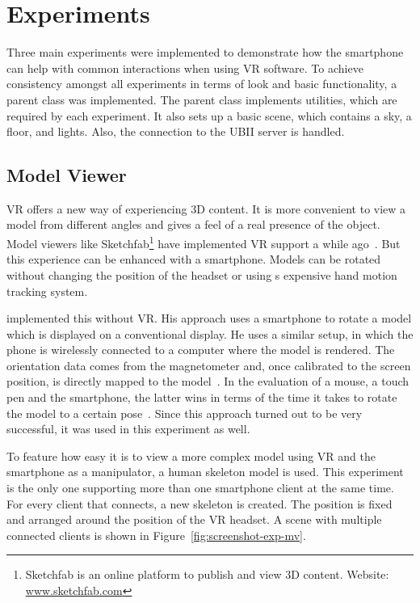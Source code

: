 \section{Experiments}\label{section:experiments}

Three main experiments were implemented to demonstrate how the smartphone can help with common interactions when using \ac{VR} software.
To achieve consistency amongst all experiments in terms of look and basic functionality, a parent class was implemented. The parent class implements utilities, which are required by each experiment. It also sets up a basic scene, which contains a sky, a floor, and lights. Also, the connection to the \ac{UBII} server is handled. 


\subsection{Model Viewer}\label{subsection:model-viewer}

\acl{VR} offers a new way of experiencing \ac{3D} content. It is more convenient to view a model from different angles and gives a feel of a real presence of the object. Model viewers like Sketchfab\footnote{Sketchfab is an online platform to publish and view \ac{3D} content. Website: \href{https://sketchfab.com}{www.sketchfab.com}} have implemented \ac{VR} support a while ago~\cite{Denoyel.2016}. But this experience can be enhanced with a smartphone. Models can be rotated without changing the position of the headset or using s expensive hand motion tracking system.

\citeauthor{Katzakis.2010} implemented this without \ac{VR}. His approach uses a smartphone to rotate a model which is displayed on a conventional display. He uses a similar setup, in which the phone is wirelessly connected to a computer where the model is rendered. The orientation data comes from the magnetometer and, once calibrated to the screen position, is directly mapped to the model~\cite[139]{Katzakis.2010}. In the evaluation of a mouse, a touch pen and the smartphone, the latter wins in terms of the time it takes to rotate the model to a certain pose~\cite[140]{Katzakis.2010}. 
Since this approach turned out to be very successful, it was used in this experiment as well. 

To feature how easy it is to view a more complex model using VR and the smartphone as a manipulator, a human skeleton model is used. This experiment is the only one supporting more than one smartphone client at the same time. For every client that connects, a new skeleton is created. The position is fixed and arranged around the position of the \ac{VR} headset. A scene with multiple connected clients is shown in Figure~\ref{fig:screenshot-exp-mv}.


